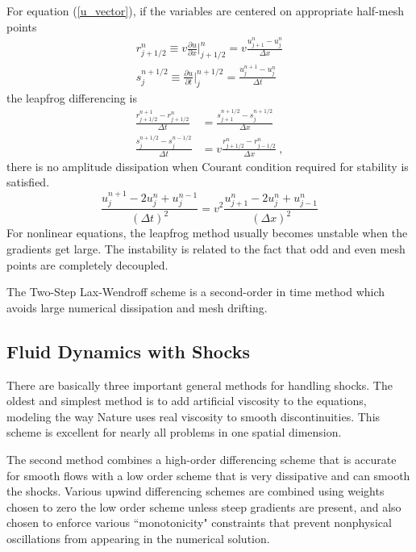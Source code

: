 \documentclass[12pt,a4paper]{article}
\begin{document}
For equation (\ref{u_vector}), if the variables are centered on appropriate half-mesh points
\begin{align}
r^n_{j+1/2} \equiv v \frac{\partial u}{\partial x} \Bigg|^n_{j+1/2} = v \frac{u_{j+1}^{n} -u_{j}^{n} }{\Delta x} \\
s_j^{n+1/2} \equiv  \frac{\partial u}{\partial t} \Bigg|_j^{n+1/2} = \frac{u_{j}^{n+1} -u_{j}^{n} }{\Delta t}
\end{align}
the leapfrog differencing is
\begin{align}
\frac{r_{j+1/2}^{n+1} -r^n_{j+1/2} }{\Delta t} &= \frac{s_{j+1}^{n+1/2} -s_{j}^{n+1/2} }{\Delta x} \\
\frac{s_{j}^{n+1/2} -s^{n-1/2}_{j} }{\Delta t} &= v \frac{r_{j+1/2}^{n} -r_{j-1/2}^{n} }{\Delta x} ~,
\end{align}
there is no amplitude dissipation when Courant condition required for stability is satisfied.
\begin{equation}
\frac{u_{j}^{n+1} -2u_j^n + u_{j}^{n-1} }{(\Delta t)^2} = v^2 \frac{u_{j+1}^{n} -2u_j^n + u_{j-1}^{n} }{(\Delta x)^2}
\end{equation}
For nonlinear equations, the leapfrog method usually becomes unstable when the gradients get large. The instability is related to the fact that odd and even mesh points are completely decoupled.

The Two-Step Lax-Wendroff scheme is a second-order in time method which avoids large numerical dissipation and mesh drifting.
















\subsection{Fluid Dynamics with Shocks}
There are basically three important general methods for handling shocks. The oldest and simplest method is to add artificial viscosity to the equations, modeling the way Nature uses real viscosity to smooth discontinuities. This scheme is excellent for nearly all problems in one spatial dimension.

The second method combines a high-order differencing scheme that is accurate for smooth flows with a low order scheme that is very dissipative and can smooth the shocks. Various upwind differencing schemes are combined using weights chosen to zero the low order scheme unless steep gradients are present, and also chosen to enforce various ``monotonicity" constraints that prevent nonphysical oscillations from appearing in the numerical solution.
\end{document}

